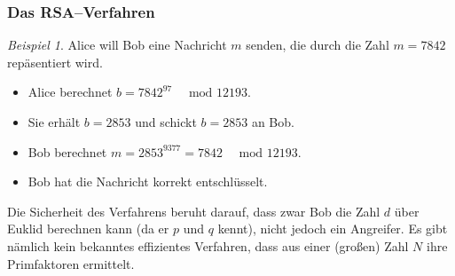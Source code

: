 \documentclass[hyperref={pdfpagelabels=false}]{beamer}
\theoremstyle{plain}%
\theoremstyle{definition}
\theoremstyle{remark}
\newtheorem*{beispiel}{Beispiel}
\begin{document}
\begin{frame}
\frametitle{Das RSA--Verfahren}

\begin{beispiel} 
Alice will Bob eine Nachricht $m$ senden, die durch die Zahl $m = 7842$ repäsentiert wird. 

\begin{itemize}
\item<2-> Alice berechnet $b = 7842^{97} \quad \text{ mod } 12193$. 
\item<3-> Sie erhält $b = 2853$ und schickt $b = 2853$ an Bob. 
\item<4-> Bob berechnet $m = 2853^{9377} = 7842 \quad \text{ mod } 12193$. 
\item<5-> Bob hat die Nachricht korrekt entschlüsselt. 
\end{itemize}

\end{beispiel}

\pause \pause \pause \pause \pause

\bigbreak

Die Sicherheit des Verfahrens beruht darauf, dass zwar Bob die Zahl $d$ über Euklid berechnen kann (da 
er $p$ und $q$ kennt), nicht jedoch ein Angreifer.  Es gibt nämlich kein bekanntes effizientes Verfahren, dass 
aus einer (großen) Zahl $N$ ihre Primfaktoren ermittelt. 

\end{frame}
\end{document}
